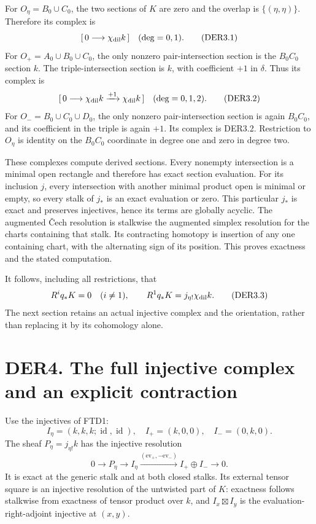 For \(O_\eta=B_0\cup C_0\), the two sections of \(K\) are zero and the
overlap is \(\{(\eta,\eta)\}\). Therefore its complex is \[
[\,0\longrightarrow\chi_{\rm dil}k\,]\quad(\deg=0,1).
\tag{DER3.1}
\] For \(O_+=A_0\cup B_0\cup C_0\), the only nonzero pair-intersection
section is the \(B_0C_0\) section \(k\). The triple-intersection section
is \(k\), with coefficient \(+1\) in \(\delta\). Thus its complex is \[
[\,0\longrightarrow\chi_{\rm dil}k
 \xrightarrow{+1}\chi_{\rm dil}k\,]\quad(\deg=0,1,2).
\tag{DER3.2}
\] For \(O_-=B_0\cup C_0\cup D_0\), the only nonzero pair-intersection
section is again \(B_0C_0\), and its coefficient in the triple is again
\(+1\). Its complex is DER3.2. Restriction to \(O_\eta\) is identity on
the \(B_0C_0\) coordinate in degree one and zero in degree two.

These complexes compute derived sections. Every nonempty intersection is
a minimal open rectangle and therefore has exact section evaluation. For
its inclusion \(j\), every intersection with another minimal product
open is minimal or empty, so every stalk of \(j_*\) is an exact
evaluation or zero. This particular \(j_*\) is exact and preserves
injectives, hence its terms are globally acyclic. The augmented Čech
resolution is stalkwise the augmented simplex resolution for the charts
containing that stalk. Its contracting homotopy is insertion of any one
containing chart, with the alternating sign of its position. This proves
exactness and the stated computation.

It follows, including all restrictions, that \[
R^i q_*K=0\quad(i\ne1),\qquad
R^1q_*K=j_{\eta!}\chi_{\rm dil}k.
\tag{DER3.3}
\] The next section retains an actual injective complex and the
orientation, rather than replacing it by its cohomology alone.

\section{DER4. The full injective complex and an explicit
contraction}\label{der4.-the-full-injective-complex-and-an-explicit-contraction}

Use the injectives of FTD1: \[
I_\eta=(k,k,k;\operatorname{id},\operatorname{id}),\quad
I_+=(k,0,0),\quad I_-=(0,k,0).
\] The sheaf \(P_\eta=j_{\eta!}k\) has the injective resolution \[
0\to P_\eta\to I_\eta
 \xrightarrow{(\mathrm{ev}_+,-\mathrm{ev}_-)}I_+\oplus I_-\to0.
\tag{DER4.1}
\] It is exact at the generic stalk and at both closed stalks. Its
external tensor square is an injective resolution of the untwisted part
of \(K\): exactness follows stalkwise from exactness of tensor product
over \(k\), and \(I_x\boxtimes I_y\) is the evaluation-right-adjoint
injective at \((x,y)\).

